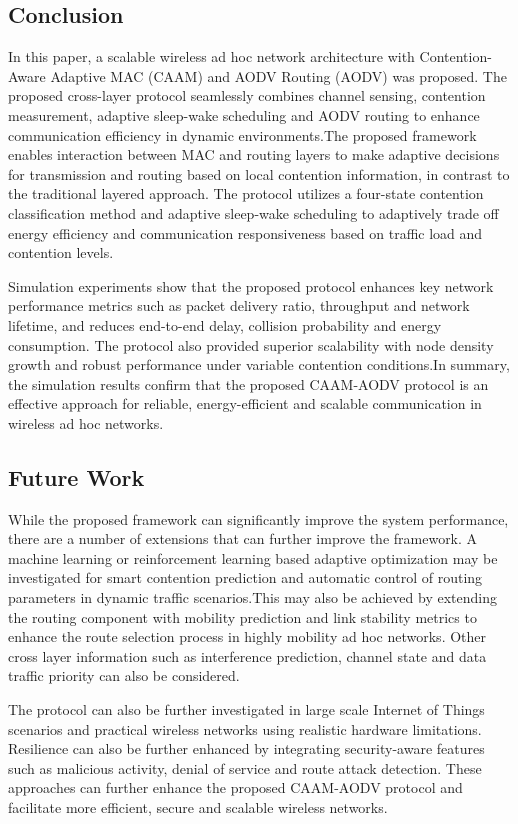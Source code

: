 \documentclass[a4paper,fleqn,final,1p]{cas-dc}
\numberwithin{equation}{section}
\begin{document}
\subsection{Conclusion}

In this paper, a scalable wireless ad hoc network architecture with Contention-Aware Adaptive MAC (CAAM) and AODV Routing (AODV) was proposed. The proposed cross-layer protocol seamlessly combines channel sensing, contention measurement, adaptive sleep-wake scheduling and AODV routing to enhance communication efficiency in dynamic environments.The proposed framework enables interaction between MAC and routing layers to make adaptive decisions for transmission and routing based on local contention information, in contrast to the traditional layered approach. The protocol utilizes a four-state contention classification method and adaptive sleep-wake scheduling to adaptively trade off energy efficiency and communication responsiveness based on traffic load and contention levels.

Simulation experiments show that the proposed protocol enhances key network performance metrics such as packet delivery ratio, throughput and network lifetime, and reduces end-to-end delay, collision probability and energy consumption. The protocol also provided superior scalability with node density growth and robust performance under variable contention conditions.In summary, the simulation results confirm that the proposed CAAM-AODV protocol is an effective approach for reliable, energy-efficient and scalable communication in wireless ad hoc networks.

\subsection{Future Work}

While the proposed framework can significantly improve the system performance, there are a number of extensions that can further improve the framework. A machine learning or reinforcement learning based adaptive optimization may be investigated for smart contention prediction and automatic control of routing parameters in dynamic traffic scenarios.This may also be achieved by extending the routing component with mobility prediction and link stability metrics to enhance the route selection process in highly mobility ad hoc networks. Other cross layer information such as interference prediction, channel state and data traffic priority can also be considered.

The protocol can also be further investigated in large scale Internet of Things scenarios and practical wireless networks using realistic hardware limitations. Resilience can also be further enhanced by integrating security-aware features such as malicious activity, denial of service and route attack detection.
These approaches can further enhance the proposed CAAM-AODV protocol and facilitate more efficient, secure and scalable wireless networks.
\end{document}
